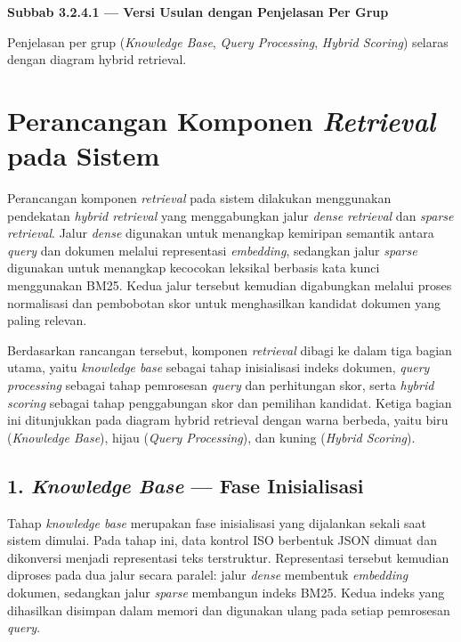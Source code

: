 \documentclass[12pt,a4paper]{article}
\begin{document}
\begin{center}
\textbf{Subbab 3.2.4.1 — Versi Usulan dengan Penjelasan Per Grup}\par
\vspace{6pt}
Penjelasan per grup (\textit{Knowledge Base}, \textit{Query Processing}, \textit{Hybrid Scoring}) selaras dengan diagram hybrid retrieval.
\end{center}

\section*{Perancangan Komponen \textit{Retrieval} pada Sistem}

Perancangan komponen \textit{retrieval} pada sistem dilakukan menggunakan pendekatan \textit{hybrid retrieval} yang menggabungkan jalur \textit{dense retrieval} dan \textit{sparse retrieval}. Jalur \textit{dense} digunakan untuk menangkap kemiripan semantik antara \textit{query} dan dokumen melalui representasi \textit{embedding}, sedangkan jalur \textit{sparse} digunakan untuk menangkap kecocokan leksikal berbasis kata kunci menggunakan BM25. Kedua jalur tersebut kemudian digabungkan melalui proses normalisasi dan pembobotan skor untuk menghasilkan kandidat dokumen yang paling relevan.

Berdasarkan rancangan tersebut, komponen \textit{retrieval} dibagi ke dalam tiga bagian utama, yaitu \textit{knowledge base} sebagai tahap inisialisasi indeks dokumen, \textit{query processing} sebagai tahap pemrosesan \textit{query} dan perhitungan skor, serta \textit{hybrid scoring} sebagai tahap penggabungan skor dan pemilihan kandidat. Ketiga bagian ini ditunjukkan pada diagram hybrid retrieval dengan warna berbeda, yaitu biru (\textit{Knowledge Base}), hijau (\textit{Query Processing}), dan kuning (\textit{Hybrid Scoring}).

\subsection*{1. \textit{Knowledge Base} --- Fase Inisialisasi}

Tahap \textit{knowledge base} merupakan fase inisialisasi yang dijalankan sekali saat sistem dimulai. Pada tahap ini, data kontrol ISO berbentuk JSON dimuat dan dikonversi menjadi representasi teks terstruktur. Representasi tersebut kemudian diproses pada dua jalur secara paralel: jalur \textit{dense} membentuk \textit{embedding} dokumen, sedangkan jalur \textit{sparse} membangun indeks BM25. Kedua indeks yang dihasilkan disimpan dalam memori dan digunakan ulang pada setiap pemrosesan \textit{query}.
\end{document}
